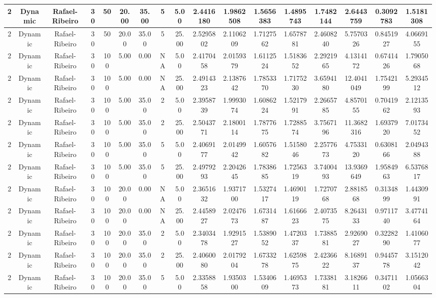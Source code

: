 \begin{longtable}{ | c | c | c | c | c | c | c | c | c | c | c | c | c | c | c | c | c | }
	\hline
	2	&	Dynamic	&	Rafael-Ribeiro	&	30	&	50	&	20.00	&	35.00	&	5	&	5.00	&	2.4416180	&	1.9862508	&	1.5656383	&	1.4895743	&	1.7482144	&	2.6443759	&	0.3092783	&	1.5181308 \\
	\hline
	2	&	Dynamic	&	Rafael-Ribeiro	&	30	&	50	&	20.00	&	35.00	&	5	&	25.00	&	2.5295802	&	2.1106209	&	1.7127562	&	1.6578781	&	2.4608240	&	5.7570326	&	0.8451927	&	4.0669155 \\
	\hline
	2	&	Dynamic	&	Rafael-Ribeiro	&	30	&	100	&	5.00	&	0.00	&	NA	&	5.00	&	2.4170458	&	2.0159379	&	1.6112524	&	1.5183652	&	2.2921965	&	4.1314172	&	0.6741426	&	1.7905068 \\
	\hline
	2	&	Dynamic	&	Rafael-Ribeiro	&	30	&	100	&	5.00	&	0.00	&	NA	&	25.00	&	2.4914323	&	2.1387642	&	1.7853370	&	1.7175230	&	3.6594180	&	12.4041049	&	1.7542199	&	5.2934512 \\
	\hline
	2	&	Dynamic	&	Rafael-Ribeiro	&	30	&	100	&	5.00	&	35.00	&	2	&	5.00	&	2.3958739	&	1.9993074	&	1.6086224	&	1.5217991	&	2.2665785	&	4.8570155	&	0.7041962	&	2.1213593 \\
	\hline
	2	&	Dynamic	&	Rafael-Ribeiro	&	30	&	100	&	5.00	&	35.00	&	2	&	25.00	&	2.5043771	&	2.1800114	&	1.7877675	&	1.7288574	&	3.7567196	&	11.3682316	&	1.6937920	&	7.0173452 \\
	\hline
	2	&	Dynamic	&	Rafael-Ribeiro	&	30	&	100	&	5.00	&	35.00	&	5	&	5.00	&	2.4069177	&	2.0149942	&	1.6057682	&	1.5158046	&	2.2577673	&	4.7533120	&	0.6308166	&	2.0494388 \\
	\hline
	2	&	Dynamic	&	Rafael-Ribeiro	&	30	&	100	&	5.00	&	35.00	&	5	&	25.00	&	2.4979293	&	2.2042645	&	1.7838685	&	1.7256319	&	3.7400493	&	13.9369649	&	1.9584963	&	6.5376817 \\
	\hline
	2	&	Dynamic	&	Rafael-Ribeiro	&	30	&	100	&	20.00	&	0.00	&	NA	&	5.00	&	2.3651632	&	1.9371700	&	1.5327417	&	1.4690119	&	1.7270768	&	2.8818568	&	0.3134899	&	1.4430991 \\
	\hline
	2	&	Dynamic	&	Rafael-Ribeiro	&	30	&	100	&	20.00	&	0.00	&	NA	&	25.00	&	2.4458927	&	2.0247673	&	1.6731487	&	1.6166623	&	2.4073575	&	8.2643133	&	0.9711740	&	3.4774164 \\
	\hline
	2	&	Dynamic	&	Rafael-Ribeiro	&	30	&	100	&	20.00	&	35.00	&	2	&	5.00	&	2.3403478	&	1.9291527	&	1.5389052	&	1.4720337	&	1.7388581	&	2.9269027	&	0.3228290	&	1.4106077 \\
	\hline
	2	&	Dynamic	&	Rafael-Ribeiro	&	30	&	100	&	20.00	&	35.00	&	2	&	25.00	&	2.4060080	&	2.0179204	&	1.6733278	&	1.6259875	&	2.4236622	&	8.1689137	&	0.9445778	&	3.1512042 \\
	\hline
	2	&	Dynamic	&	Rafael-Ribeiro	&	30	&	100	&	20.00	&	35.00	&	5	&	5.00	&	2.3358858	&	1.9350300	&	1.5340609	&	1.4695373	&	1.7338181	&	3.1826611	&	0.3471102	&	1.0566304 \\

\end{longtable}
